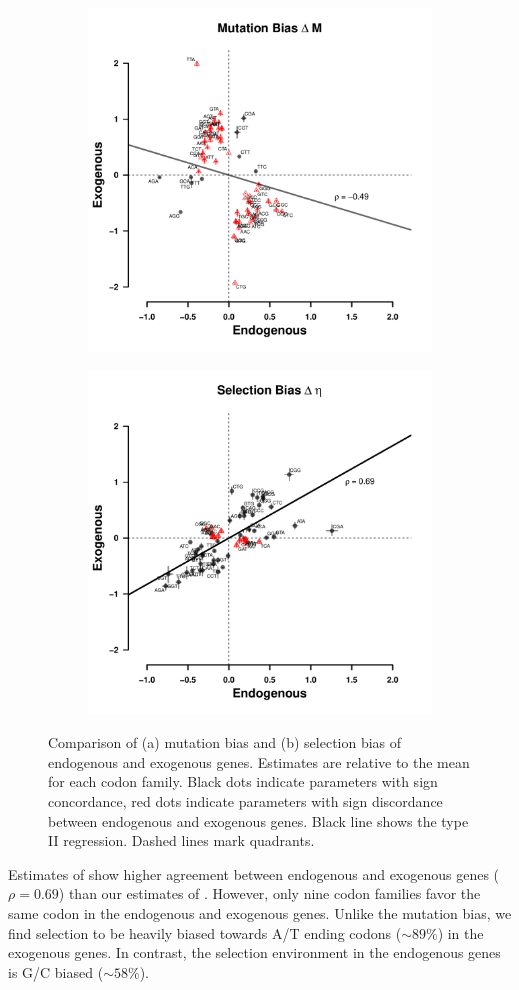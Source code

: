 \documentclass[12pt]{article}
\begin{document}
\begin{figure}[h]
    \centering
    \begin{subfigure}
        \centering
        \includegraphics[width=.45\textwidth]{img/csp_corr_dm.pdf}
    \end{subfigure}
    \begin{subfigure}
        \centering
        \includegraphics[width=.45\textwidth]{img/csp_corr_deta.pdf}
    \end{subfigure}
    \caption{Comparison of (a) mutation bias \DM and (b) selection bias \DE of endogenous and exogenous genes. Estimates are relative to the mean for each codon family. Black dots indicate parameters with sign concordance, red dots indicate parameters with sign discordance between endogenous and exogenous genes. Black line shows the type II regression. Dashed lines mark quadrants.}
    \label{fig:csp_comp}
\end{figure}

Estimates of \DE show higher agreement between endogenous and exogenous genes ($\rho = 0.69$) than our estimates of \DM.
However, only nine codon families favor the same codon in the endogenous and exogenous genes.
Unlike the mutation bias, we find selection to be heavily biased towards A/T ending codons ($\sim 89 \%$) in the exogenous genes.
In contrast, the selection environment in the endogenous genes is G/C biased ($\sim 58 \%$).
\end{document}
